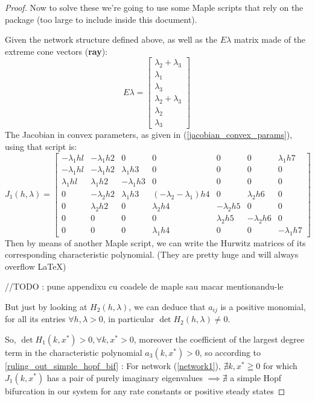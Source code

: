 \begin{proof}
	Now to solve these we're going to use some Maple scripts that rely on the \cite{franz2016ConvexMaple} package (too large to include inside this document).

	Given the network structure defined above, as well as the $E\lambda$ matrix made of the extreme cone vectors (\textbf{ray}):
	\[
		E\lambda =
		\begin{bmatrix}
			\lambda_2 + \lambda_3 \\
			\lambda_1 \\
			\lambda_3 \\
			\lambda_2 + \lambda_3 \\
			\lambda_2 \\
			\lambda_3
		\end{bmatrix}
	\]
	The Jacobian in convex parameters, as given in (\ref{jacobian_convex_params}), using that script is:
	\[
		\left. J_1(h,\lambda)=
		\left[
			\begin{array}{ccccccc}-\lambda_1hl&-\lambda_1h2&0&0&0&0&\lambda_1h7\\-\lambda_1hl&-\lambda_1h2&\lambda_1h3&0&0&0&0\\\lambda_1hl&\lambda_1h2&-\lambda_1h3&0&0&0&0\\0&-\lambda_2h2&\lambda_1h3&(-\lambda_2-\lambda_1)h4&0&\lambda_2h6&0\\0&\lambda_2h2&0&\lambda_2h4&-\lambda_2h5&0&0\\0&0&0&0&\lambda_2h5&-\lambda_2h6&0\\0&0&0&\lambda_1h4&0&0&-\lambda_1h7
		\end{array}\right.\right]
	\]
	Then by means of another Maple script, we can write the Hurwitz matrices of its corresponding characteristic polynomial. (They are pretty huge and will always overflow \LaTeX)

	\hfill\break
	//TODO : pune appendixu cu coadele de maple sau macar mentionandu-le
	\hfill\break

	But just by looking at $H_2(h,\lambda)$, we can deduce that $a_{ij}$ is a positive monomial, for all  its entries $\forall h , \lambda > 0$, in particular $\det H_2(h, \lambda) \neq 0$.

	So, $\det H_1(k,x^*) > 0, \forall k, x^* > 0$, moreover the coefficient of the largest degree term in the characteristic polynomial $a_3(k, x^*) > 0$, so according to \ref{ruling_out_simple_hopf_bif} : For network (\ref{network1}), $\nexists k, x^* \geqq 0$ for which $J_1(k,x^*)$ has a pair of purely imaginary eigenvalues $\implies \nexists$ a simple Hopf bifurcation in our system for any rate constants or positive steady states
\end{proof}

